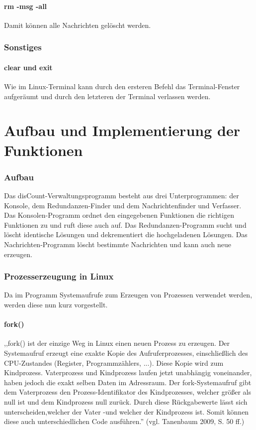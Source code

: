 \documentclass[12pt]{report}
\begin{document}
\subsubsection{rm -msg -all}
Damit können alle Nachrichten gelöscht werden.


\subsection{Sonstiges}

\subsubsection{clear und exit}
Wie im Linux-Terminal kann durch den ersteren Befehl das Terminal-Fenster aufgeräumt und durch den letzteren der Terminal verlassen werden. 


\chapter{Aufbau und Implementierung der Funktionen}
\lhead{\thepage}

\subsection{Aufbau}
Das disCount-Verwaltungsprogramm besteht aus drei Unterprogrammen: der Konsole, dem Redundanzen-Finder und dem Nachrichtenfinder und Verfasser. Das Konsolen-Programm ordnet den eingegebenen Funktionen die richtigen Funktionen zu und ruft diese auch auf. Das Redundanzen-Programm sucht und löscht identische Lösungen und dekrementiert die hochgeladenen Lösungen. Das Nachrichten-Programm löscht bestimmte Nachrichten und kann auch neue erzeugen.

\subsection{Prozesserzeugung in Linux}
Da im Programm Systemaufrufe zum Erzeugen von Prozessen verwendet werden, werden diese nun kurz vorgestellt.

\subsubsection{fork()}
,,fork() ist der einzige Weg in Linux einen neuen Prozess zu erzeugen. Der Systemaufruf erzeugt eine exakte Kopie des Aufruferprozesses, einschließlich des CPU-Zustandes (Register, Programmzählers, ...). Diese Kopie wird zum Kindprozess. Vaterprozess und Kindprozess laufen jetzt unabhängig voneinander, haben jedoch die exakt selben Daten im Adressraum. Der fork-Systemaufruf gibt dem Vaterprozess den Prozess-Identifikator des Kindprozesses, welcher größer als null ist und dem Kindprozess null zurück. Durch diese Rückgabewerte lässt sich unterscheiden,welcher der Vater -und welcher der Kindprozess ist. Somit können diese auch unterschiedlichen Code ausführen.'' (vgl. Tanenbaum 2009, S. 50 ff.\nocite{OS})
\end{document}
